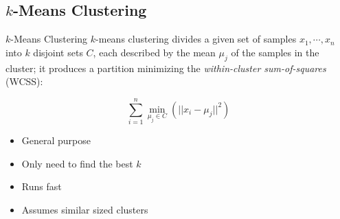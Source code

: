 \documentclass[xcolor=dvipsnames]{beamer}
\begin{document}
\subsection{$k$-Means Clustering}
\begin{frame}{$k$-Means Clustering}
  $k$-means clustering\cite{Tan:2018:IDM:3208440} divides a given set of samples
  $x_1, \cdots, x_n$ into $k$ disjoint sets $C$, each described by the mean
  $\mu_j$ of the samples in the cluster;
  it produces a partition minimizing the \textit{within-cluster sum-of-squares} (WCSS):

  \[
      \sum_{i=1}^{n} \underset{\mu_j \in C}{\min}(||x_i - \mu_j||^2)
  \]

  \begin{itemize}
    \item General purpose
    \item Only need to find the best $k$
    \item Runs fast
    \item Assumes similar sized clusters
  \end{itemize}
\end{frame}
\end{document}
